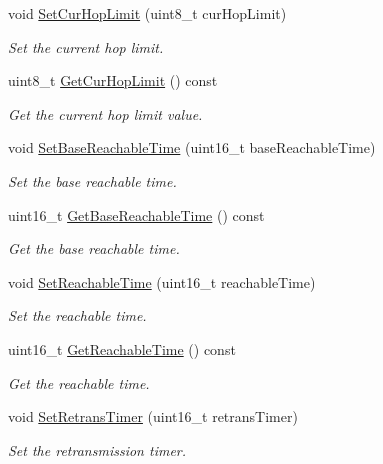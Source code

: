 \begin{DoxyCompactItemize}
void \hyperlink{classns3_1_1Ipv6Interface_a828092082dfa8cd1f1c10c3a0c6ce074}{Set\+Cur\+Hop\+Limit} (uint8\+\_\+t cur\+Hop\+Limit)
\begin{DoxyCompactList}\small\item\em Set the current hop limit. \end{DoxyCompactList}\item 
uint8\+\_\+t \hyperlink{classns3_1_1Ipv6Interface_acb12c2652e66e4347b07eb0bfd015380}{Get\+Cur\+Hop\+Limit} () const 
\begin{DoxyCompactList}\small\item\em Get the current hop limit value. \end{DoxyCompactList}\item 
void \hyperlink{classns3_1_1Ipv6Interface_aa9df3adba28c8f41be7085f3fbe9868b}{Set\+Base\+Reachable\+Time} (uint16\+\_\+t base\+Reachable\+Time)
\begin{DoxyCompactList}\small\item\em Set the base reachable time. \end{DoxyCompactList}\item 
uint16\+\_\+t \hyperlink{classns3_1_1Ipv6Interface_a219eb6a1d9ead1397e20b5ba302f97bc}{Get\+Base\+Reachable\+Time} () const 
\begin{DoxyCompactList}\small\item\em Get the base reachable time. \end{DoxyCompactList}\item 
void \hyperlink{classns3_1_1Ipv6Interface_a42ab31621b6818ed722adea37e67fe78}{Set\+Reachable\+Time} (uint16\+\_\+t reachable\+Time)
\begin{DoxyCompactList}\small\item\em Set the reachable time. \end{DoxyCompactList}\item 
uint16\+\_\+t \hyperlink{classns3_1_1Ipv6Interface_aa7514b04043f9ff8b728a2bce00af2fc}{Get\+Reachable\+Time} () const 
\begin{DoxyCompactList}\small\item\em Get the reachable time. \end{DoxyCompactList}\item 
void \hyperlink{classns3_1_1Ipv6Interface_a30b1eaf2e12f7848c5f305e147703892}{Set\+Retrans\+Timer} (uint16\+\_\+t retrans\+Timer)
\begin{DoxyCompactList}\small\item\em Set the retransmission timer. \end{DoxyCompactList}\item 

\end{DoxyCompactItemize}

